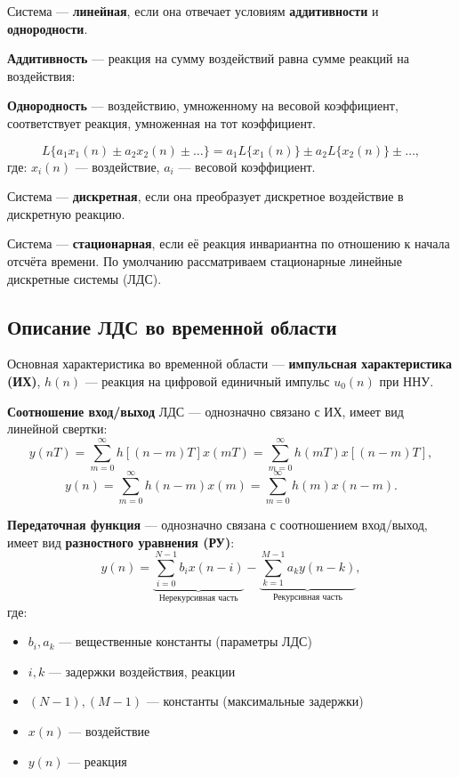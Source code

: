 \documentclass[a4paper, 14pt]{extarticle}
\begin{document}
Система --- \textbf{линейная}, если она отвечает условиям \textbf{аддитивности} и \textbf{однородности}.

\textbf{Аддитивность} --- реакция на сумму воздействий равна сумме реакций на воздействия:

\textbf{Однородность} --- воздействию, умноженному на весовой коэффициент, соответствует реакция, умноженная на тот коэффициент.

\begin{equation}
    L\{ a_1 x_1(n) \pm a_2 x_2(n) \pm \ldots \} = a_1 L\{ x_1(n)\} \pm a_2 L\{x_2(n)\} \pm \ldots,
\end{equation}
где: $x_i(n)$ --- воздействие, $a_i$ --- весовой коэффициент.

Система --- \textbf{дискретная}, если она преобразует дискретное воздействие в дискретную реакцию.

Система --- \textbf{стационарная}, если её реакция инвариантна по отношению к начала отсчёта времени. По умолчанию рассматриваем стационарные линейные дискретные системы (ЛДС).

\subsection{Описание ЛДС во временной области}
Основная характеристика во временной области --- \textbf{импульсная характеристика (ИХ)}, $h(n)$ --- реакция на цифровой единичный импульс $u_0(n)$ при ННУ.

\textbf{Соотношение вход/выход} ЛДС --- однозначно связано с ИХ, имеет вид линейной свертки:
\begin{equation}\label{eq:in_out}
    y(nT) = \sum^{\infty}_{m=0} h[ (n - m)T ] x(mT) = \sum^{\infty}_{m=0} h(mT) x [ (n-m)T ],
\end{equation}
\begin{equation}\label{eq:in_out:2}
    y(n) = \sum^{\infty}_{m=0} h(n-m)x(m) = \sum^{\infty}_{m=0} h(m) x(n-m).
\end{equation}

\textbf{Передаточная функция} --- однозначно связана с соотношением вход/выход, имеет вид \textbf{разностного уравнения (РУ)}:
\begin{equation}\label{eq:ru}
    y(n) = \underbrace{\sum^{N-1}_{i=0} b_i x(n-i)}_\text{Нерекурсивная часть} - \underbrace{\sum^{M-1}_{k=1} a_k y(n-k)}_\text{Рекурсивная часть},
\end{equation}
где:
\begin{itemize}
    \item $b_i, a_k$ --- вещественные константы (параметры ЛДС)
    \item $i, k$ --- задержки воздействия, реакции
    \item $(N-1), (M-1)$ --- константы (максимальные задержки)
    \item $x(n)$ --- воздействие
    \item $y(n)$ --- реакция
\end{itemize}
\end{document}
